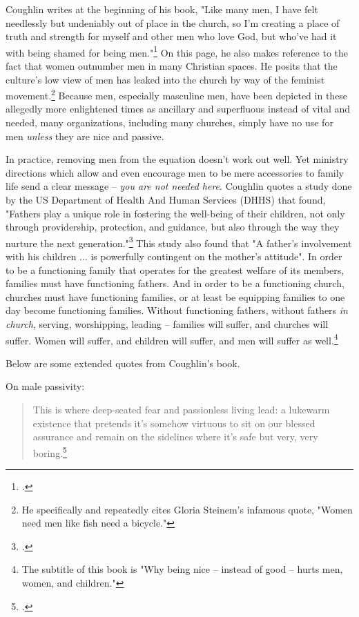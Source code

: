 Coughlin writes at the beginning of his book, "Like many men, I have felt needlessly but undeniably out of place in the church, so I'm creating a place of truth and strength for myself and other men who love God, but who've had it with being shamed for being men."\footcite[p. 27]{coughlinnice}  On this page, he also makes reference to the fact that women outnumber men in many Christian spaces.  He posits that the culture's low view of men has leaked into the church by way of the feminist movement.\footnote{He specifically and repeatedly cites Gloria Steinem's infamous quote, "Women need men like fish need a bicycle."}  Because men, especially masculine men, have been depicted in these allegedly more enlightened times as ancillary and superfluous instead of vital and needed, many organizations, including many churches, simply have no use for men \textit{unless} they are nice and passive.  

In practice, removing men from the equation doesn't work out well.  Yet ministry directions which allow and even encourage men to be mere accessories to family life send a clear message -- \textit{you are not needed here}.  Coughlin quotes a study done by the US Department of Health And Human Services (DHHS) that found, "Fathers play a unique role in fostering the well-being of their children, not only through providership, protection, and guidance, but also through the way they nurture the next generation."\footcite[p. 120]{coughlinnice}  This study also found that "A father's involvement with his children ... is powerfully contingent on the mother's attitude".  In order to be a functioning family that operates for the greatest welfare of its members, families must have functioning fathers.  And in order to be a functioning church, churches must have functioning families, or at least be equipping families to one day become functioning families.  Without functioning fathers, without fathers \textit{in church}, serving, worshipping, leading -- families will suffer, and churches will suffer.  Women will suffer, and children will suffer, and men will suffer as well.\footnote{The subtitle of this book is "Why being nice -- instead of good -- hurts men, women, and children."}

Below are some extended quotes from Coughlin's book.

\smallskip
\noindent
On male passivity:
\begin{quote}
This is where deep-seated fear and passionless living lead: a lukewarm existence that pretends it's somehow virtuous to sit on our blessed assurance and remain on the sidelines where it's safe but very, very boring.\footcite[p. 189, although the "blessed assurance" quip was removed in subsequent editions]{coughlinnice}
\end{quote}

